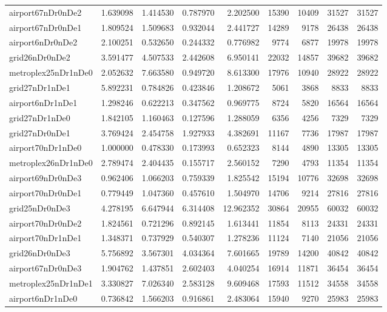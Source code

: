\begin{longtable}{|l|r|r|r|r|r|r|r|r|}
airport67nDr0nDe2 & 1.639098 & 1.414530 & 0.787970 & 2.202500 & 15390 & 10409 & 31527 & 31527 \\
airport67nDr0nDe1 & 1.809524 & 1.509683 & 0.932044 & 2.441727 & 14289 & 9178 & 26438 & 26438 \\
airport6nDr0nDe2 & 2.100251 & 0.532650 & 0.244332 & 0.776982 & 9774 & 6877 & 19978 & 19978 \\
grid26nDr0nDe2 & 3.591477 & 4.507533 & 2.442608 & 6.950141 & 22032 & 14857 & 39682 & 39682 \\
metroplex25nDr1nDe0 & 2.052632 & 7.663580 & 0.949720 & 8.613300 & 17976 & 10940 & 28922 & 28922 \\
grid27nDr1nDe1 & 5.892231 & 0.784826 & 0.423846 & 1.208672 & 5061 & 3868 & 8833 & 8833 \\
airport6nDr1nDe1 & 1.298246 & 0.622213 & 0.347562 & 0.969775 & 8724 & 5820 & 16564 & 16564 \\
grid27nDr1nDe0 & 1.842105 & 1.160463 & 0.127596 & 1.288059 & 6356 & 4256 & 7329 & 7329 \\
grid27nDr0nDe1 & 3.769424 & 2.454758 & 1.927933 & 4.382691 & 11167 & 7736 & 17987 & 17987 \\
airport70nDr1nDe0 & 1.000000 & 0.478330 & 0.173993 & 0.652323 & 8144 & 4890 & 13305 & 13305 \\
metroplex26nDr1nDe0 & 2.789474 & 2.404435 & 0.155717 & 2.560152 & 7290 & 4793 & 11354 & 11354 \\
airport69nDr0nDe3 & 0.962406 & 1.066203 & 0.759339 & 1.825542 & 15194 & 10776 & 32698 & 32698 \\
airport70nDr0nDe1 & 0.779449 & 1.047360 & 0.457610 & 1.504970 & 14706 & 9214 & 27816 & 27816 \\
grid25nDr0nDe3 & 4.278195 & 6.647944 & 6.314408 & 12.962352 & 30864 & 20955 & 60032 & 60032 \\
airport70nDr0nDe2 & 1.824561 & 0.721296 & 0.892145 & 1.613441 & 11854 & 8113 & 24331 & 24331 \\
airport70nDr1nDe1 & 1.348371 & 0.737929 & 0.540307 & 1.278236 & 11124 & 7140 & 21056 & 21056 \\
grid26nDr0nDe3 & 5.756892 & 3.567301 & 4.034364 & 7.601665 & 19789 & 14200 & 40842 & 40842 \\
airport67nDr0nDe3 & 1.904762 & 1.437851 & 2.602403 & 4.040254 & 16914 & 11871 & 36454 & 36454 \\
metroplex25nDr1nDe1 & 3.330827 & 7.026340 & 2.583128 & 9.609468 & 17593 & 11512 & 34558 & 34558 \\
airport6nDr1nDe0 & 0.736842 & 1.566203 & 0.916861 & 2.483064 & 15940 & 9270 & 25983 & 25983 \\

\end{longtable}

